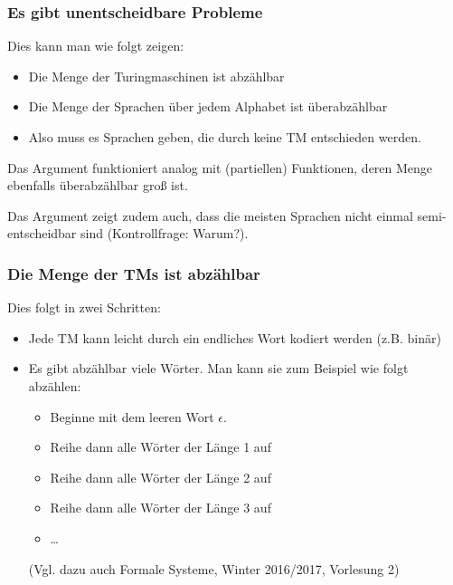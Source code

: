 \documentclass[onlymath]{beamer}
\begin{document}


\begin{frame}\frametitle{Es gibt unentscheidbare Probleme}


\pause
Dies kann man wie folgt zeigen:
\begin{itemize}
\item Die Menge der Turingmaschinen ist abzählbar
\item Die Menge der Sprachen über jedem Alphabet ist überabzählbar
\item Also muss es Sprachen geben, die durch keine TM entschieden werden.
\end{itemize}
\pause

Das Argument funktioniert analog mit (partiellen) Funktionen, deren Menge ebenfalls überabzählbar groß ist.\medskip

Das Argument zeigt zudem auch, dass die meisten Sprachen nicht einmal semi-entscheidbar sind (Kontrollfrage: Warum?).

\end{frame}

\begin{frame}\frametitle{Die Menge der TMs ist abzählbar}

\pause
Dies folgt in zwei Schritten:
\begin{itemize}
\item Jede TM kann leicht durch ein endliches Wort kodiert werden (z.B. binär)
\item Es gibt abzählbar viele Wörter. Man kann sie zum Beispiel wie folgt abzählen:
\begin{itemize}
\item Beginne mit dem leeren Wort $\epsilon$.
\item Reihe dann alle Wörter der Länge 1 auf
\item Reihe dann alle Wörter der Länge 2 auf
\item Reihe dann alle Wörter der Länge 3 auf
\item \ldots
\end{itemize}
\footnotesize
(Vgl. dazu auch Formale Systeme, Winter 2016/2017, Vorlesung 2)

\end{itemize}

\end{frame}
\end{document}
